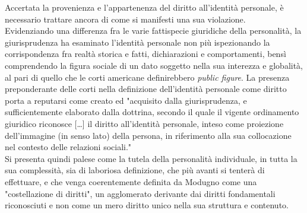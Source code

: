 Accertata la provenienza e l'appartenenza del diritto all'identità personale, 
è necessario trattare ancora di come si manifesti una sua violazione.
\\Evidenziando una differenza fra le varie fattispecie giuridiche della personalità, la giurisprudenza ha esaminato l'identità personale non più ispezionando la corrispondenza fra realtà storica e fatti, dichiarazioni e comportamenti, bensì comprendendo la figura sociale di un dato soggetto nella sua interezza e globalità, al pari di quello che le corti americane definirebbero \textit{public figure}.
La presenza preponderante delle corti nella definizione dell'identità personale come diritto porta a reputarsi come creato ed "acquisito dalla giurisprudenza, e sufficientemente elaborato dalla dottrina, secondo il quale il vigente ordinamento giuridico riconosce […] il diritto all’identità personale, inteso come proiezione dell’immagine (in senso lato) della persona, in riferimento alla sua collocazione nel contesto delle relazioni sociali."
\\Si presenta quindi palese come la tutela della personalità individuale, in tutta la sua complessità, sia di laboriosa definizione, che più avanti si tenterà di effettuare, e che venga coerentemente definita da Modugno come una "costellazione di diritti", un agglomerato derivante dai diritti fondamentali riconosciuti e non come un mero diritto unico nella sua struttura e contenuto.

